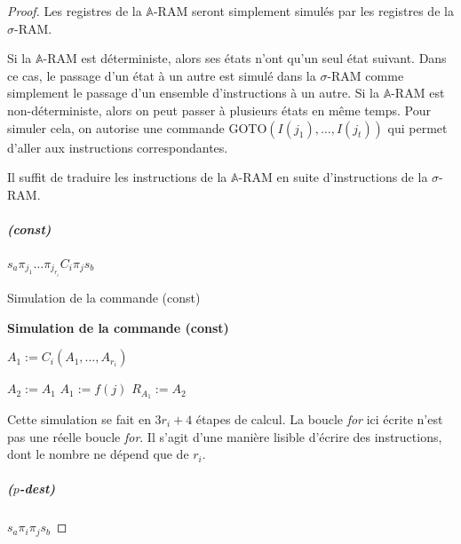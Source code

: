 \documentclass{report}
\newcommand{\bbA}{\mathbb{A}}
\begin{document}
				\begin{proof}
					Les registres de la $\bbA$-RAM seront simplement simulés par les registres de la $\sigma$-RAM. 
					
					Si la $\bbA$-RAM est déterministe, alors ses états n'ont qu'un seul état suivant. Dans ce cas, le passage d'un état à un autre est simulé dans la $\sigma$-RAM comme simplement le passage d'un ensemble d'instructions à un autre. Si la $\bbA$-RAM est non-déterministe, alors on peut passer à plusieurs états en même temps. Pour simuler cela, on autorise une commande $\text{GOTO}(I(j_1), \dots, I(j_t))$ qui permet d'aller aux instructions correspondantes. 
					
					Il suffit de traduire les instructions de la $\bbA$-RAM en suite d'instructions de la $\sigma$-RAM.
					
					\subparagraph{(const)}
					$s_a \pi_{j_1} \dots \pi_{j_{r_i}} C_i \pi_j s_b$
					
					
					
					
					\begin{algorithm}[H]
						\caption{Simulation de la commande (const)}
						
						
						\textbf{Simulation de la commande (const)} 
						
						\espace 
						
						
						
							
						
						$A_1 := C_i (A_1, \dots, A_{r_i})$\;
						
						
						$A_2 := A_1$\;
						$A_1 := f(j)$\;
						$R_{A_1} := A_2$\;
					\end{algorithm}
					
					\espace
					
					Cette simulation se fait en $3r_i + 4$ étapes de calcul. La boucle \emph{for} ici écrite n'est pas une réelle boucle \emph{for}. Il s'agit d'une manière lisible d'écrire des instructions, dont le nombre ne dépend que de $r_i$.

					
					\subparagraph{($p$-dest)}
					$s_a \pi_i \pi_j s_b$
					

\end{proof}
\end{document}
